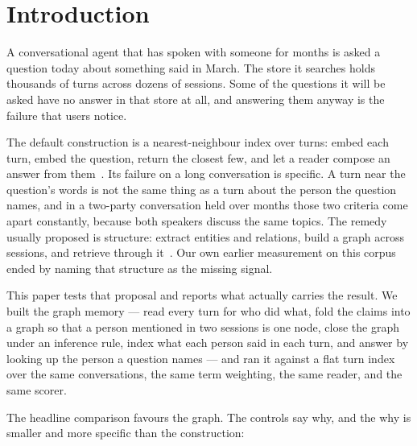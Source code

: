 \documentclass[11pt]{article}
\begin{document}
\begin{abstract}
No language model was called, in either index or the reader, so absolute F1 is
far below published model results on this benchmark and is not comparable to
them; the systems are comparable to each other because they differ in exactly
one thing at a time. The harness is public, stdlib-only, and fetches the
dataset itself.
\end{abstract}

\tableofcontents
\vspace{1em}

\section{Introduction}
\label{sec:intro}

A conversational agent that has spoken with someone for months is asked a
question today about something said in March. The store it searches holds
thousands of turns across dozens of sessions. Some of the questions it will be
asked have no answer in that store at all, and answering them anyway is the
failure that users notice.

The default construction is a nearest-neighbour index over turns: embed each
turn, embed the question, return the closest few, and let a reader compose an
answer from them~\cite{rag,dpr}. Its failure on a long conversation is specific.
A turn near the question's words is not the same thing as a turn about the
person the question names, and in a two-party conversation held over months
those two criteria come apart constantly, because both speakers discuss the
same topics. The remedy usually proposed is structure: extract entities and
relations, build a graph across sessions, and retrieve through
it~\cite{graphrag,hipporag}. Our own earlier measurement on this
corpus~\cite{multihop} ended by naming that structure as the missing signal.

This paper tests that proposal and reports what actually carries the result. We
built the graph memory --- read every turn for who did what, fold the claims
into a graph so that a person mentioned in two sessions is one node, close the
graph under an inference rule, index what each person said in each turn, and
answer by looking up the person a question names --- and ran it against a flat
turn index over the same conversations, the same term weighting, the same
reader, and the same scorer.

The headline comparison favours the graph. The controls say why, and the why is
smaller and more specific than the construction:
\end{document}
